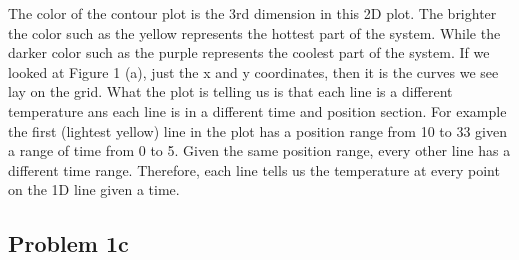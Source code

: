 \documentclass[12pt]{article}
\begin{document}
The color of the contour plot is the 3rd dimension in this 2D plot. The brighter the color such as the yellow represents the hottest part of the system. While the darker color such as the purple represents the coolest part of the system. If we looked at Figure 1 (a), just the x and y coordinates, then it is the curves we see lay on the grid. What the plot is telling us is that each line is a different temperature ans each line is in a different time and position section. For example the first (lightest yellow) line in the plot has a position range from 10 to 33 given a range of time from 0 to 5. Given the same position range, every other line has a different time range. Therefore, each line tells us the temperature at every point on the 1D line given a time.

\subsection*{Problem 1c}
\end{document}
